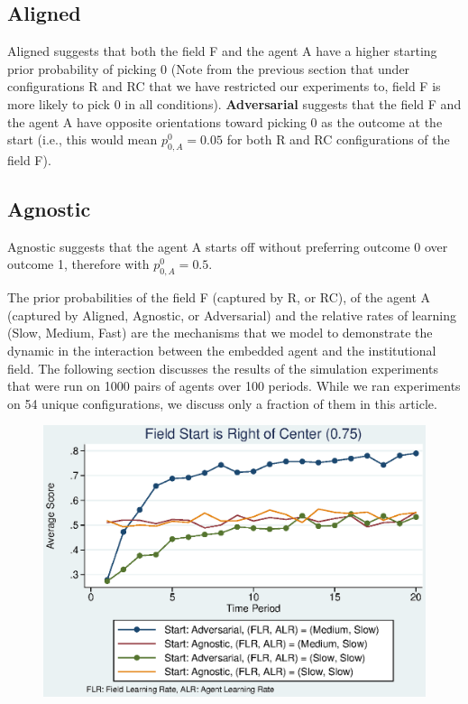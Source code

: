 \documentclass[12pt,letterpaper]{article}
\begin{document}
\subsection{Aligned} 
\indent Aligned suggests that both the field F and the agent A have a higher starting prior probability of picking 0 (Note from the previous section that under configurations R and RC that we have restricted our experiments to, field F is more likely to pick 0 in all conditions). \textbf{Adversarial} suggests that the field F and the agent A have opposite orientations toward picking 0 as the outcome at the start (i.e., this would mean $p_{0,A}^0 = 0.05$ for both R and RC configurations of the field F). 

\subsection{Agnostic} 
\indent Agnostic suggests that the agent A starts off without preferring outcome 0 over outcome 1, therefore with $p_{0,A}^0 = 0.5$.

The prior probabilities of the field F (captured by R, or RC), of the agent A (captured by Aligned, Agnostic, or Adversarial) and the relative rates of learning (Slow, Medium, Fast) are the mechanisms that we model to demonstrate the dynamic in the interaction between the embedded agent and the institutional field. The following section discusses the results of the simulation experiments that were run on 1000 pairs of agents over 100 periods. While we ran experiments on 54 unique configurations, we discuss only a fraction of them in this article.
\begin{figure}[h]
\begin{centering}
  \caption{}
  \includegraphics[width=\textwidth]{frcmedium3a}
  \label{fig:3a}
\end{centering}
\end{figure}
\end{document}
